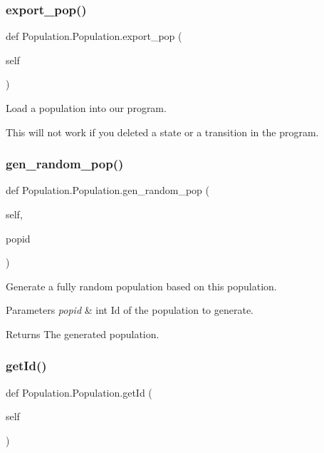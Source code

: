 \subsubsection{\texorpdfstring{export\_pop()}{export\_pop()}}
{\footnotesize\ttfamily def Population.\+Population.\+export\+\_\+pop (\begin{DoxyParamCaption}\item[{}]{self }\end{DoxyParamCaption})}



Load a population into our program. 

This will not work if you deleted a state or a transition in the program. \mbox{\label{classPopulation_1_1Population_abc84fe3de4076d70b62cda01207eb0bb}} 
\subsubsection{\texorpdfstring{gen\_random\_pop()}{gen\_random\_pop()}}
{\footnotesize\ttfamily def Population.\+Population.\+gen\+\_\+random\+\_\+pop (\begin{DoxyParamCaption}\item[{}]{self,  }\item[{}]{popid }\end{DoxyParamCaption})}



Generate a fully random population based on this population. 


\begin{DoxyParams}{Parameters}
{\em popid} & int Id of the population to generate. \\
\hline
\end{DoxyParams}
\begin{DoxyReturn}{Returns}
The generated population. 
\end{DoxyReturn}
\mbox{\label{classPopulation_1_1Population_ac97f6af1eb7b996b529bbb00cb56f147}} 
\subsubsection{\texorpdfstring{getId()}{getId()}}
{\footnotesize\ttfamily def Population.\+Population.\+get\+Id (\begin{DoxyParamCaption}\item[{}]{self }\end{DoxyParamCaption})}



